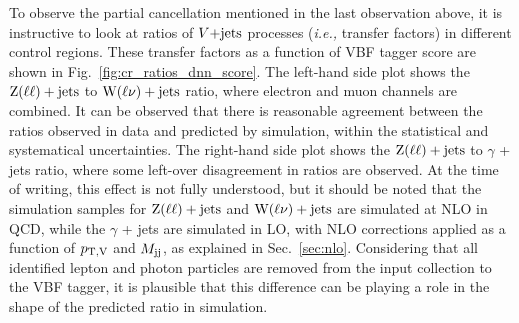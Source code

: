 To observe the partial cancellation mentioned in the last observation above, it is instructive to
look at ratios of $V\text{+jets}$ processes (\textit{i.e.,} transfer factors) in different control regions.
These transfer factors as a function of VBF tagger score are shown in
Fig.~\ref{fig:cr_ratios_dnn_score}. The left-hand side plot shows the $\mathrm{Z}(\ell\ell)+\textrm{jets}$ to $\textrm{W}(\ell\nu)+\textrm{jets}$ ratio,
where electron and muon channels are combined. It can be observed that there is reasonable agreement between
the ratios observed in data and predicted by simulation, within the statistical and systematical uncertainties.
The right-hand side plot shows the $\mathrm{Z}(\ell\ell)+\textrm{jets}$ to $\gamma$ + jets ratio, where some left-over disagreement in ratios
are observed. At the time of writing, this effect is not fully understood, but it should be noted that 
the simulation samples for $\mathrm{Z}(\ell\ell)+\textrm{jets}$ and $\textrm{W}(\ell\nu)+\textrm{jets}$ are simulated at NLO in QCD, while the $\gamma$ + jets are
simulated in LO, with NLO corrections applied as a function of $p_{\mathrm{T},\mathrm{V}}$ and $M_{\textrm{jj}}$, as explained in Sec.~\ref{sec:nlo}.
Considering that all identified lepton and photon particles are removed from the input collection to the VBF tagger,
it is plausible that this difference can be playing a role in the shape of the predicted ratio in simulation. 

